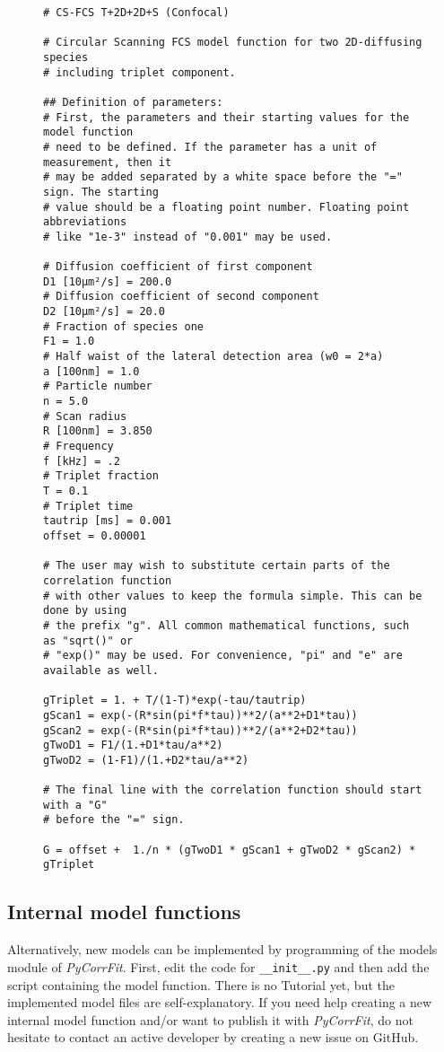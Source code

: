 \begin{figure}
\begin{Verbatim}[frame = single]
# CS-FCS T+2D+2D+S (Confocal)

# Circular Scanning FCS model function for two 2D-diffusing species
# including triplet component.

## Definition of parameters:
# First, the parameters and their starting values for the model function
# need to be defined. If the parameter has a unit of measurement, then it 
# may be added separated by a white space before the "=" sign. The starting
# value should be a floating point number. Floating point abbreviations 
# like "1e-3" instead of "0.001" may be used.

# Diffusion coefficient of first component
D1 [10µm²/s] = 200.0
# Diffusion coefficient of second component
D2 [10µm²/s] = 20.0
# Fraction of species one
F1 = 1.0
# Half waist of the lateral detection area (w0 = 2*a)
a [100nm] = 1.0
# Particle number
n = 5.0
# Scan radius
R [100nm] = 3.850
# Frequency
f [kHz] = .2
# Triplet fraction
T = 0.1
# Triplet time
tautrip [ms] = 0.001
offset = 0.00001

# The user may wish to substitute certain parts of the correlation function
# with other values to keep the formula simple. This can be done by using 
# the prefix "g". All common mathematical functions, such as "sqrt()" or 
# "exp()" may be used. For convenience, "pi" and "e" are available as well.

gTriplet = 1. + T/(1-T)*exp(-tau/tautrip)
gScan1 = exp(-(R*sin(pi*f*tau))**2/(a**2+D1*tau))
gScan2 = exp(-(R*sin(pi*f*tau))**2/(a**2+D2*tau))
gTwoD1 = F1/(1.+D1*tau/a**2)
gTwoD2 = (1-F1)/(1.+D2*tau/a**2)

# The final line with the correlation function should start with a "G"
# before the "=" sign.

G = offset +  1./n * (gTwoD1 * gScan1 + gTwoD2 * gScan2) * gTriplet
\end{Verbatim}
\end{figure}

\subsection{Internal model functions}
Alternatively, new models can be implemented by programming of the models module of \textit{PyCorrFit}. First, edit the code for \texttt{\_\_init\_\_.py} and then add the script containing the model function. There is no Tutorial yet, but the implemented model files are self-explanatory. If you need help creating a new internal model function and/or want to publish it with \textit{PyCorrFit}, do not hesitate to contact an active developer by creating a new issue on GitHub.

